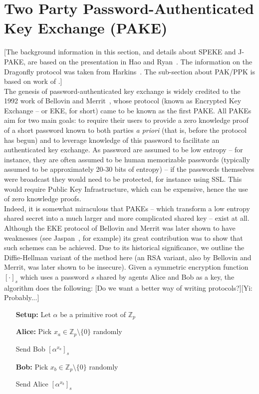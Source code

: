 \documentclass{amsart}
\newcommand{\comment}[1]{\marginpar{\color{red}{\Huge$*$}}\mbox{}{\sf\color{red}[#1]}}
\theoremstyle{remark}
\begin{document}

\section{Two Party Password-Authenticated Key Exchange (PAKE)} 
\label{sec:PAKE}
 [The background information in this section, and details about SPEKE and J-PAKE, are based on the presentation 
 in Hao and Ryan~\cite{HaRy2010}. The information on the Dragonfly protocol was taken from Harkins~\cite{Ha15}.  
 The sub-section about PAK/PPK is based on work of \cite{BoMaPa00}.]
 \\
 
 The genesis of password-authenticated key exchange is widely credited to the 1992 work of Bellovin and 
 Merrit~\cite{BeMe92}, whose protocol (known as Encrypted Key Exchange -- or EKE, for short) came to 
 be known as the first PAKE.  All PAKEs aim for two main goals: to require their users to provide a zero 
 knowledge proof of a short password known to both parties \emph{a priori} (that is, before the protocol 
 has begun) and to leverage knowledge of this password to facilitate an authenticated key exchange.  As 
 password are assumed to be low entropy -- for instance, they are often assumed to be human memorizable 
 passwords (typically assumed to be approximately 20-30 bits of entropy) -- if the passwords 
 themselves were broadcast they would need to be protected, for instance using SSL.  This would require Public 
 Key Infrastructure, which can be expensive, hence the use of zero knowledge proofs.
 \\

 Indeed, it is somewhat miraculous that PAKEs -- which transform a low entropy shared secret into a 
 much larger and more complicated shared key -- exist at all.  Although the EKE protocol of Bellovin and 
 Merrit was later shown to have weaknesses (see Jaspan~\cite{Ja96}, for example) its great contribution was 
 to show that such schemes can be achieved.  Due to its historical significance, we outline the Diffie-Hellman
 variant of the method here (an RSA variant, also by Bellovin and Merrit, was later shown to be insecure).  
 Given a symmetric encryption function $[\cdot]_s$ which uses a password $s$ shared
 by agents Alice and Bob as a key, the algorithm does the following: \comment{Do we want a better way of writing protocols?}\comment{Yi: Probably...}
 \\

 \begin{itemize}
 \item[\textbf{Setup:}] Let $\alpha$ be a primitive root of $\mathbb{Z}_p$
 \item[\textbf{Alice:}] Pick $x_a \in \mathbb{Z}_p \setminus \{0\}$ randomly
 \item[] Send Bob $\left[\alpha^{x_a}\right]_s$
  \item[\textbf{Bob:}] Pick $x_b \in \mathbb{Z}_p \setminus \{0\}$ randomly
 \item[] Send Alice $\left[\alpha^{x_b}\right]_s$
 \item[]
 \end{itemize}
\end{document}
